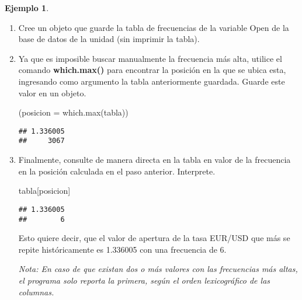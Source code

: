\documentclass[
]{book}
\newenvironment{Shaded}{\begin{snugshade}}{\end{snugshade}}
\newcommand{\AttributeTok}[1]{\textcolor[rgb]{0.77,0.63,0.00}{#1}}
\newcommand{\FunctionTok}[1]{\textcolor[rgb]{0.00,0.00,0.00}{#1}}
\newcommand{\NormalTok}[1]{#1}
\newcommand{\OtherTok}[1]{\textcolor[rgb]{0.56,0.35,0.01}{#1}}
\newcommand{\SpecialCharTok}[1]{\textcolor[rgb]{0.00,0.00,0.00}{#1}}
\theoremstyle{definition}
\theoremstyle{definition}
\newtheorem{example}{Ejemplo}[chapter]
\theoremstyle{definition}
\theoremstyle{definition}
\theoremstyle{remark}
\begin{document}
\begin{example}
\leavevmode

\begin{enumerate}
\def\labelenumi{\arabic{enumi}.}
\item
  Cree un objeto que guarde la tabla de frecuencias de la variable Open de la base de datos de la unidad (sin imprimir la tabla).

\begin{Shaded}
\end{Shaded}
\item
  Ya que es imposible buscar manualmente la frecuencia más alta, utilice el comando \textbf{which.max()} para encontrar la posición en la que se ubica esta, ingresando como argumento la tabla anteriormente guardada. Guarde este valor en un objeto.

\begin{Shaded}
\begin{Highlighting}[]
\NormalTok{(}\AttributeTok{posicion =} \FunctionTok{which.max}\NormalTok{(tabla))}
\end{Highlighting}
\end{Shaded}

\begin{verbatim}
## 1.336005 
##     3067
\end{verbatim}
\item
  Finalmente, consulte de manera directa en la tabla en valor de la frecuencia en la posición calculada en el paso anterior. Interprete.

\begin{Shaded}
\begin{Highlighting}[]
\NormalTok{tabla[posicion]}
\end{Highlighting}
\end{Shaded}

\begin{verbatim}
## 1.336005 
##        6
\end{verbatim}

  Esto quiere decir, que el valor de apertura de la tasa EUR/USD que más se repite históricamente es 1.336005 con una frecuencia de 6.

  \emph{Nota: En caso de que existan dos o más valores con las frecuencias más altas, el programa solo reporta la primera, según el orden lexicográfico de las columnas.}
\end{enumerate}

\end{example}
\end{document}
